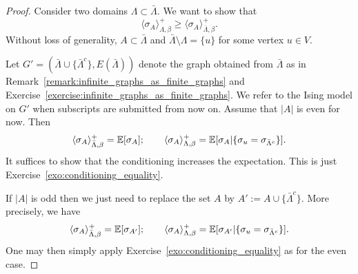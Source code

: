 \begin{proof}
    Consider two domains $\Lambda\subset\bar\Lambda$.
    We want to show that
    \[
        \langle\sigma_A\rangle_{\Lambda,\beta}^+
        \geq
        \langle\sigma_A\rangle_{\bar\Lambda,\beta}^+.
    \]
    Without loss of generality,
    $A\subset\bar\Lambda$ and
    $\bar\Lambda\setminus\Lambda=\{u\}$ for some
    vertex $u\in V$.

    Let $G'=(\bar\Lambda\cup\{\bar\Lambda^c\},E(\bar\Lambda))$ denote the graph obtained from $\bar\Lambda$
    as in Remark~\ref{remark:infinite_graphs_as_finite_graphs}
    and Exercise~\ref{exercise:infinite_graphs_as_finite_graphs}.
    We refer to the Ising model on $G'$ when subscripts are submitted from now on.
    Assume that $|A|$ is even for now.
    Then
    \begin{equation}
        \langle\sigma_A\rangle_{\bar\Lambda,\beta}^+
        =
        \mathbb E[\sigma_A];\qquad
        \langle\sigma_A\rangle_{\Lambda,\beta}^+
        =
        \mathbb E[\sigma_A|\{\sigma_u=\sigma_{\bar\Lambda^c}\}].
    \end{equation}
    It suffices to show that the conditioning increases the expectation.
    This is just Exercise~\ref{exo:conditioning_equality}.
    

    If $|A|$ is odd then we just need to replace the set $A$
    by $A':=A\cup\{\bar\Lambda^c\}$.
    More precisely,
    we have
    \begin{equation}
        \langle\sigma_A\rangle_{\bar\Lambda,\beta}^+
        =
        \mathbb E[\sigma_{A'}];\qquad
        \langle\sigma_A\rangle_{\Lambda,\beta}^+
        =
        \mathbb E[\sigma_{A'}|\{\sigma_u=\sigma_{\bar\Lambda^c}\}].
    \end{equation}
    One may then simply apply Exercise~\ref{exo:conditioning_equality} as for the even case.
\end{proof}


